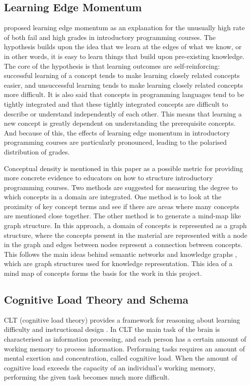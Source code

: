 \documentclass[12pt]{article}
\theoremstyle{grammarstyle}
\begin{document}
\subsection{Learning Edge Momentum}
\cite{robins2010learning} proposed learning edge momentum as an explanation for the unusually high rate of both fail and high grades in introductory programming courses. The hypothesis builds upon the idea that we learn at the edges of what we know, or in other words, it is easy to learn things that build upon pre-existing knowledge. The core of the hypothesis is that learning outcomes are self-reinforcing: successful learning of a concept tends to make learning closely related concepts easier, and unsuccessful learning tends to make learning closely related concepts more difficult. It is also said that concepts in programming languages tend to be tightly integrated and that these tightly integrated concepts are difficult to describe or understand independently of each other. This means that learning a new concept is greatly dependent on understanding the prerequisite concepts. And because of this, the effects of learning edge momentum in introductory programming courses are particularly pronounced, leading to the polarised distribution of grades. 

Conceptual density is mentioned in this paper as a possible metric for providing more concrete evidence to educators on how to structure introductory programming courses. Two methods are suggested for measuring the degree to which concepts in a domain are integrated. One method is to look at the proximity of key concept terms and see if there are areas where many concepts are mentioned close together. The other method is to generate a mind-map like graph structure. In this approach, a domain of concepts is represented as a graph structure, where the concepts present in the material are represented with a node in the graph and edges between nodes represent a connection between concepts. This follows the main ideas behind semantic networks and knowledge graphs \citep{sowa1987semantic, zhang2002knowledge, koncel2019text}, which are graph structures used for knowledge representation. This idea of a mind map of concepts forms the basis for the work in this project.

\subsection{Cognitive Load Theory and Schema}
CLT (cognitive load theory) provides a framework for reasoning about learning difficulty and instructional design \citep{sweller1994cognitive}. In CLT the main task of the brain is characterised as information processing, and each person has a certain amount of working memory to process information. Performing tasks requires an amount of mental exertion and concentration, called cognitive load. When the amount of cognitive load exceeds the capacity of an individual's working memory, performing the given task becomes much more difficult. 
\end{document}
